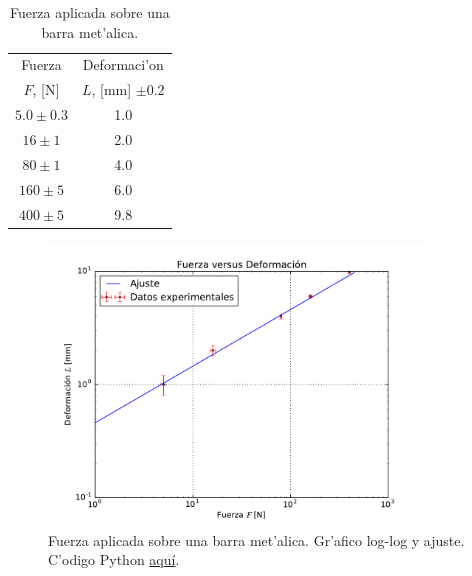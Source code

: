 \begin{table}[h!]
\begin{center}
\begin{tabular}{|c|c|}
\hline 
Fuerza & Deformaci'on \\ 
$F$, [N] & $L$, [mm] $\pm 0.2$ \\ \hline
$5.0\pm 0.3$ & 1.0 \\ \hline 
$16\pm 1$ & 2.0 \\ \hline
$80\pm 1$ & 4.0 \\ \hline
$160\pm 5$ & 6.0 \\ \hline
$400\pm 5$ & 9.8\\ \hline
\end{tabular}
\caption{Fuerza aplicada sobre una barra met'alica.}
\label{tab-exp2}
\end{center}
\end{table}
\begin{figure}[h!]
\begin{center}
\includegraphics[width=10cm]{figs/fig-ajuste-log-log.pdf}
\caption{Fuerza aplicada sobre una barra met'alica. Gr'afico log-log y ajuste. C'odigo Python \href{https://github.com/gfrubi/Lab/blob/master/python/fig-ajuste-log-log.py}{aqu\'i}.}
\end{center}
\label{fig-exp2}
\end{figure}

